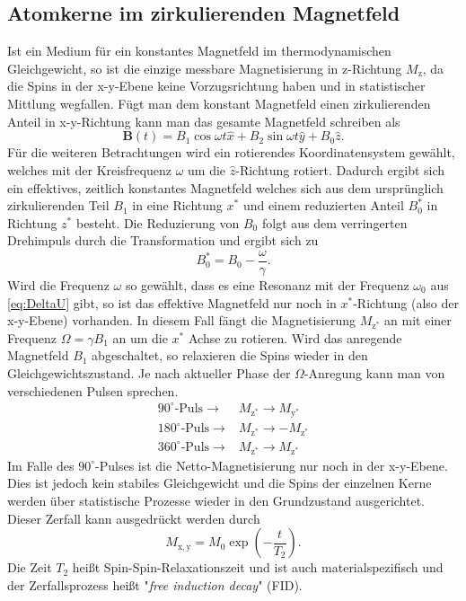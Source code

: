 \documentclass[numbers=noenddot,a4paper,notitlepage,twoside,BCOR15mm]{scrartcl}
\begin{document}
	\subsection{Atomkerne im zirkulierenden Magnetfeld}
	Ist ein Medium für ein konstantes Magnetfeld im thermodynamischen Gleichgewicht, so ist die einzige messbare Magnetisierung in z-Richtung $M_\mathrm{z}$, da die Spins in der x-y-Ebene keine Vorzugsrichtung haben und in statistischer Mittlung wegfallen. Fügt man dem konstant Magnetfeld einen zirkulierenden Anteil in x-y-Richtung kann man das gesamte Magnetfeld schreiben als 
	\begin{equation}
		\mathbf{B}(t)= B_1 \cos \omega t \hat{x} +B_2 \sin \omega t \hat{y} +B_0 \hat{z}.
	\end{equation}
	Für die weiteren Betrachtungen wird ein rotierendes Koordinatensystem gewählt, welches mit der Kreisfrequenz $\omega$ um die $\hat{z}$-Richtung rotiert. Dadurch ergibt sich ein effektives, zeitlich konstantes Magnetfeld welches sich aus dem ursprünglich zirkulierenden Teil $B_1$ in eine Richtung $x^*$ und einem reduzierten Anteil $B_0^*$ in Richtung $z^*$ besteht. Die Reduzierung von $B_0$ folgt aus dem verringerten Drehimpuls durch die Transformation und ergibt sich zu
	\begin{equation}
		B_0^* = B_0 - \frac{\omega}{\gamma}.
	\end{equation}
	Wird die Frequenz $\omega$ so gewählt, dass es eine Resonanz mit der Frequenz $\omega_0$ aus \eqref{eq:DeltaU} gibt, so ist das effektive Magnetfeld nur noch in $x^*$-Richtung (also der x-y-Ebene) vorhanden. In diesem Fall fängt die Magnetisierung $M_{\mathrm{z}^*}$ an mit einer Frequenz $\Omega = \gamma B_1$ an um die $x^*$ Achse zu rotieren. Wird das anregende Magnetfeld $B_1$ abgeschaltet, so relaxieren die Spins wieder in den Gleichgewichtszustand. Je nach aktueller Phase der $\Omega$-Anregung kann man von verschiedenen Pulsen sprechen.
	\begin{align}
		90^\circ\text{-Puls} \rightarrow& M_{\mathrm{z}^*} \rightarrow M_{\mathrm{y}^*} \nonumber \\
		180^\circ\text{-Puls} \rightarrow& M_{\mathrm{z}^*} \rightarrow -M_{\mathrm{z}^*} \nonumber \\
		360^\circ\text{-Puls} \rightarrow& M_{\mathrm{z}^*} \rightarrow M_{\mathrm{z}^*} \nonumber 
	\end{align}
	Im Falle des $90^\circ$-Pulses ist die Netto-Magnetisierung nur noch in der x-y-Ebene. Dies ist jedoch kein stabiles Gleichgewicht und die Spins der einzelnen Kerne werden über statistische Prozesse wieder in den Grundzustand ausgerichtet. Dieser Zerfall kann ausgedrückt werden durch
	\begin{equation}
		M_\mathrm{x,y} = M_0 \exp\left(-\frac{t}{T_2}\right).
	\end{equation}
	Die Zeit $T_2$ heißt Spin-Spin-Relaxationszeit und ist auch materialspezifisch und der Zerfallsprozess heißt {}"\textit{free induction decay}{}" (FID).
	\newpage
\end{document}
